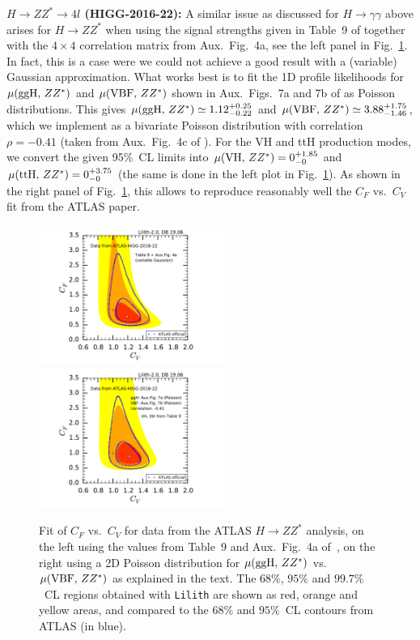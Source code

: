 {\bf\boldmath $H\to ZZ^*\to 4l$ (HIGG-2016-22):} A similar issue as discussed for $H\to\gamma\gamma$ above arises 
for $H\to ZZ^*$ when using the signal strengths given in Table~9 of \cite{Aaboud:2017vzb} together with the $4\times 4$ 
correlation matrix from Aux.\ Fig.~4a, see the left panel in Fig.~\ref{fig:validation_atlas_ZZ}.  
In fact, this is a case were we could not achieve a good result with a (variable) Gaussian approximation. 
What works best is to fit the 1D profile likelihoods for $\mu({\rm ggH},\,ZZ^*)$ and $\mu({\rm VBF},\,ZZ^*)$ shown in Aux.\ Figs.~7a and 7b of \cite{Aaboud:2017vzb} as Poisson distributions. This gives $\mu({\rm ggH},\,ZZ^*)\simeq 1.12^{+0.25}_{-0.22}$ and 
$\mu({\rm VBF},\,ZZ^*)\simeq 3.88^{+1.75}_{-1.46}$, which we implement as a bivariate Poisson distribution with    
correlation $\rho=-0.41$ (taken from Aux.\ Fig.~4c of \cite{Aaboud:2017vzb}). 
For the VH and ttH production modes, we convert the given 95\%~CL limits into $\mu({\rm VH},\,ZZ^*)=0^{+1.85}_{-0}$ and 
$\mu({\rm ttH},\,ZZ^*)=0^{+3.75}_{-0}$ (the same is done in the left plot in Fig.~\ref{fig:validation_atlas_ZZ}). 
As shown in the right panel of Fig.~\ref{fig:validation_atlas_ZZ}, this allows to reproduce reasonably well the $C_F$ vs.\ $C_V$ 
fit from the ATLAS paper.

\begin{figure}[h!]\centering
\includegraphics[width=0.54\textwidth]{validation/ATLAS/HIGG-2016-22-CVCF-4d.pdf}%
\hspace{-13mm}\includegraphics[width=0.54\textwidth]{validation/ATLAS/HIGG-2016-22-CVCF-fit.pdf}%
\vspace*{-2mm}
\caption{Fit of $C_F$ vs.\ $C_V$ for data from the ATLAS $H\to ZZ^*$ analysis, 
on the left using the values from Table~9 and Aux.\ Fig.~4a of~\cite{Aaboud:2017vzb}, 
on the right using a 2D Poisson distribution for $\mu({\rm ggH},\,ZZ^*)$ vs.\ $\mu({\rm VBF},\,ZZ^*)$ as explained in the text. 
The  $68\%$,  $95\%$ and $99.7\%$~CL regions obtained with {\tt Lilith} are shown as red, orange and yellow areas, 
and compared to the $68\%$ and  $95\%$~CL contours from ATLAS (in blue).}
\label{fig:validation_atlas_ZZ}
\end{figure}

